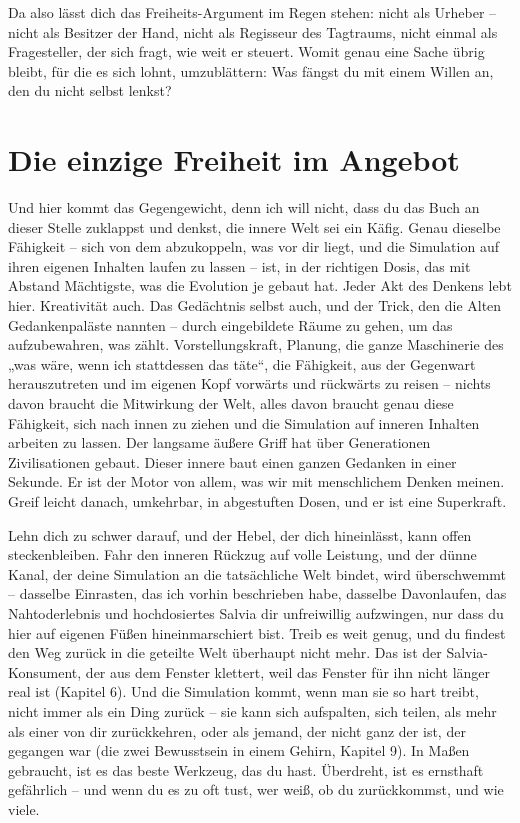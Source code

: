\documentclass[11pt, twoside, openright]{book}
\begin{document}
Da also lässt dich das Freiheits-Argument im Regen stehen: nicht als Urheber -- nicht als Besitzer der Hand, nicht als Regisseur des Tagtraums, nicht einmal als Fragesteller, der sich fragt, wie weit er steuert. Womit genau eine Sache übrig bleibt, für die es sich lohnt, umzublättern: Was fängst du mit einem Willen an, den du nicht selbst lenkst?


\chapter{Die einzige Freiheit im Angebot}

Und hier kommt das Gegengewicht, denn ich will nicht, dass du das Buch an dieser Stelle zuklappst und denkst, die innere Welt sei ein Käfig. Genau dieselbe Fähigkeit -- sich von dem abzukoppeln, was vor dir liegt, und die Simulation auf ihren eigenen Inhalten laufen zu lassen -- ist, in der richtigen Dosis, das mit Abstand Mächtigste, was die Evolution je gebaut hat. Jeder Akt des Denkens lebt hier. Kreativität auch. Das Gedächtnis selbst auch, und der Trick, den die Alten Gedankenpaläste nannten -- durch eingebildete Räume zu gehen, um das aufzubewahren, was zählt. Vorstellungskraft, Planung, die ganze Maschinerie des „was wäre, wenn ich stattdessen das täte“, die Fähigkeit, aus der Gegenwart herauszutreten und im eigenen Kopf vorwärts und rückwärts zu reisen -- nichts davon braucht die Mitwirkung der Welt, alles davon braucht genau diese Fähigkeit, sich nach innen zu ziehen und die Simulation auf inneren Inhalten arbeiten zu lassen. Der langsame äußere Griff hat über Generationen Zivilisationen gebaut. Dieser innere baut einen ganzen Gedanken in einer Sekunde. Er ist der Motor von allem, was wir mit menschlichem Denken meinen. Greif leicht danach, umkehrbar, in abgestuften Dosen, und er ist eine Superkraft.

Lehn dich zu schwer darauf, und der Hebel, der dich hineinlässt, kann offen steckenbleiben. Fahr den inneren Rückzug auf volle Leistung, und der dünne Kanal, der deine Simulation an die tatsächliche Welt bindet, wird überschwemmt -- dasselbe Einrasten, das ich vorhin beschrieben habe, dasselbe Davonlaufen, das Nahtoderlebnis und hochdosiertes Salvia dir unfreiwillig aufzwingen, nur dass du hier auf eigenen Füßen hineinmarschiert bist. Treib es weit genug, und du findest den Weg zurück in die geteilte Welt überhaupt nicht mehr. Das ist der Salvia-Konsument, der aus dem Fenster klettert, weil das Fenster für ihn nicht länger real ist (Kapitel 6). Und die Simulation kommt, wenn man sie so hart treibt, nicht immer als ein Ding zurück -- sie kann sich aufspalten, sich teilen, als mehr als einer von dir zurückkehren, oder als jemand, der nicht ganz der ist, der gegangen war (die zwei Bewusstsein in einem Gehirn, Kapitel 9). In Maßen gebraucht, ist es das beste Werkzeug, das du hast. Überdreht, ist es ernsthaft gefährlich -- und wenn du es zu oft tust, wer weiß, ob du zurückkommst, und wie viele.
\end{document}
